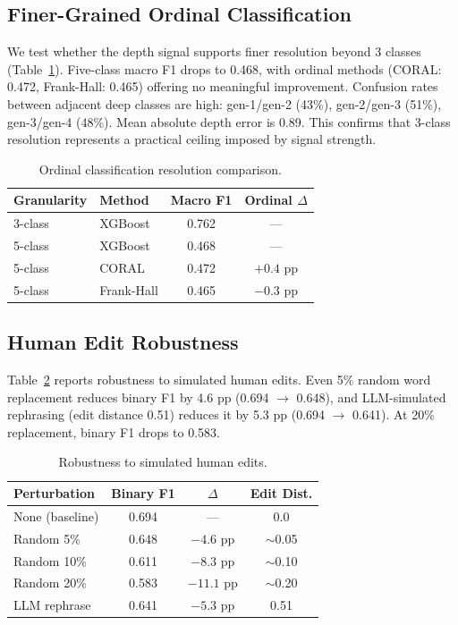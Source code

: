 \documentclass[11pt]{article}
\begin{document}
\subsection{Finer-Grained Ordinal Classification}
\label{sec:ordinal}

We test whether the depth signal supports finer resolution beyond 3 classes (Table~\ref{tab:ordinal}). Five-class macro F1 drops to 0.468, with ordinal methods (CORAL: 0.472, Frank-Hall: 0.465) offering no meaningful improvement. Confusion rates between adjacent deep classes are high: gen-1/gen-2 (43\%), gen-2/gen-3 (51\%), gen-3/gen-4 (48\%). Mean absolute depth error is 0.89. This confirms that 3-class resolution represents a practical ceiling imposed by signal strength.

\begin{table}[t]
\centering
\small
\caption{Ordinal classification resolution comparison.}
\label{tab:ordinal}
\begin{tabular}{llcc}
\toprule
\textbf{Granularity} & \textbf{Method} & \textbf{Macro F1} & \textbf{Ordinal $\Delta$} \\
\midrule
3-class & XGBoost & 0.762 & --- \\
5-class & XGBoost & 0.468 & --- \\
5-class & CORAL & 0.472 & $+0.4$ pp \\
5-class & Frank-Hall & 0.465 & $-0.3$ pp \\
\bottomrule
\end{tabular}
\end{table}

\subsection{Human Edit Robustness}
\label{sec:robustness}

Table~\ref{tab:robust} reports robustness to simulated human edits. Even 5\% random word replacement reduces binary F1 by 4.6 pp (0.694 $\to$ 0.648), and LLM-simulated rephrasing (edit distance 0.51) reduces it by 5.3 pp (0.694 $\to$ 0.641). At 20\% replacement, binary F1 drops to 0.583.

\begin{table}[t]
\centering
\small
\caption{Robustness to simulated human edits.}
\label{tab:robust}
\begin{tabular}{lccc}
\toprule
\textbf{Perturbation} & \textbf{Binary F1} & \textbf{$\Delta$} & \textbf{Edit Dist.} \\
\midrule
None (baseline) & 0.694 & --- & 0.0 \\
Random 5\% & 0.648 & $-4.6$ pp & $\sim$0.05 \\
Random 10\% & 0.611 & $-8.3$ pp & $\sim$0.10 \\
Random 20\% & 0.583 & $-11.1$ pp & $\sim$0.20 \\
LLM rephrase & 0.641 & $-5.3$ pp & 0.51 \\
\bottomrule
\end{tabular}
\end{table}
\end{document}
